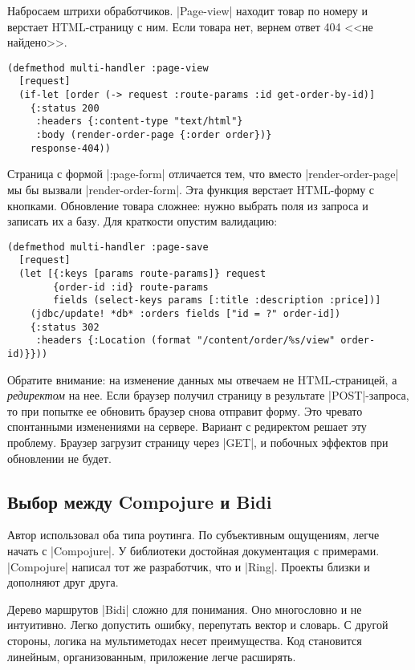 Набросаем штрихи обработчиков. \spverb|Page-view| находит товар по номеру и
верстает HTML-страницу с ним. Если товара нет, вернем ответ 404 <<не найдено>>.

\begin{verbatim}
(defmethod multi-handler :page-view
  [request]
  (if-let [order (-> request :route-params :id get-order-by-id)]
    {:status 200
     :headers {:content-type "text/html"}
     :body (render-order-page {:order order})}
    response-404))
\end{verbatim}

Страница с формой \spverb|:page-form| отличается тем, что вместо
\spverb|render-order-page| мы бы вызвали \spverb|render-order-form|. Эта
функция верстает HTML-форму с кнопками. Обновление товара сложнее: нужно выбрать поля из
запроса и записать их а базу. Для краткости опустим валидацию:

\begin{verbatim}
(defmethod multi-handler :page-save
  [request]
  (let [{:keys [params route-params]} request
        {order-id :id} route-params
        fields (select-keys params [:title :description :price])]
    (jdbc/update! *db* :orders fields ["id = ?" order-id])
    {:status 302
     :headers {:Location (format "/content/order/%s/view" order-id)}}))
\end{verbatim}

Обратите внимание: на изменение данных мы отвечаем не HTML-страницей, а
\emph{редиректом} на нее. Если браузер получил страницу в результате
\spverb|POST|-запроса, то при попытке ее обновить браузер снова отправит
форму. Это чревато спонтанными изменениями на сервере. Вариант с редиректом решает
эту проблему. Браузер загрузит страницу через \spverb|GET|, и побочных эффектов
при обновлении не будет.

\subsection{Выбор между Compojure и Bidi}

Автор использовал оба типа роутинга. По субъективным ощущениям, легче начать с
\spverb|Compojure|. У библиотеки достойная документация с примерами. \spverb|Compojure| написал
тот же разработчик, что и \spverb|Ring|. Проекты близки и дополняют друг друга.

Дерево маршрутов \spverb|Bidi| сложно для понимания. Оно многословно и не
интуитивно. Легко допустить ошибку, перепутать вектор и словарь. С другой
стороны, логика на мультиметодах несет преимущества. Код становится линейным,
организованным, приложение легче расширять.

